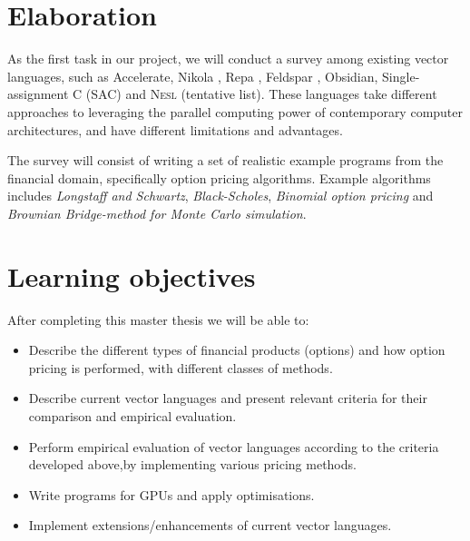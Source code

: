 \documentclass[10pt,a4paper,final,oneside,openany,article]{memoir}
\begin{document}
\chapter{Elaboration}


As the first task in our project, we will conduct a survey among
existing vector languages, such as
Accelerate\cite{chakravarty2011accelerating}, Nikola
\cite{mainland2010nikola}, Repa \cite{keller2010regular}, Feldspar
\cite{axelsson2010feldspar}, Obsidian, Single-assignment C (SAC) and
\textsc{Nesl} (tentative list). These languages take different
approaches to leveraging the parallel computing power of contemporary
computer architectures, and have different limitations and advantages.

The survey will consist of writing a set of realistic example programs
from the financial domain, specifically option pricing
algorithms. Example algorithms includes \textit{Longstaff and
  Schwartz}, \textit{Black-Scholes}, \textit{Binomial option pricing}
and \textit{Brownian Bridge-method for Monte Carlo simulation}.



\chapter{Learning objectives}
After completing this master thesis we will be able to:
\begin{itemize}
\item Describe the different types of financial products (options) and
  how option pricing is performed, with different classes of methods.
\item Describe current vector languages and present relevant criteria
  for their comparison and empirical evaluation.
\item Perform empirical evaluation of vector languages according to
  the criteria developed above,by implementing various pricing
  methods.
\item Write programs for GPUs and apply optimisations.
\item Implement extensions/enhancements of current vector languages.
\end{itemize}
\end{document}
